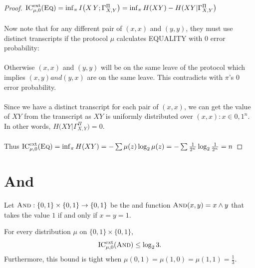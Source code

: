 \begin{proof}
	$\mathrm{IC}^{\mathrm{ext}}_{\mu,0}(\textsc{Eq}) = \inf_{\pi} I\big( X\,Y ; \Gamma_{X,Y}^\Pi \big) = \inf_{\pi} H(XY) - H(XY|\Gamma_{X,Y}^\Pi \big)$\\
	\\
	Now note that for any different pair of $(x,x)$ and $(y,y)$, they must use distinct transcripts if the protocol $\mu$ calculates EQUALITY with $0$ error probability: \\
	\\ 
	Otherwise $(x,x)$ and $(y,y)$ will be on the same leave of the protocol which implies $(x,y) and (y,x)$ are on the same leave. This contradicts with $\pi$'s $0$ error probability. \\
	\\
	Since we have a distinct transcript for each pair of $(x,x)$, we can get the value of $XY$ from the transcript as $XY$ is uniformly distributed over ${(x,x): x \in {0,1}^n}$. In other words, $H(XY|\Gamma_{X,Y}^\Pi \big) = 0$.\\
	\\
	Thus $\mathrm{IC}^{\mathrm{ext}}_{\mu,0}(\textsc{Eq}) = \inf_{\pi} H(XY) = - \sum \mu(z)\log_2\mu(z) = - \sum \frac1{2^n}\log_2\frac1{2^n} = n$
\end{proof}


\section{And}

Let $\textsc{And} : \{0,1\} \times \{0,1\} \to \{0,1\}$ be the and function $\textsc{And}(x,y) = x \wedge y$ that takes the value $1$ if and only if $x = y = 1$.

\begin{theorem}
	For every distribution $\mu$ on $\{0,1\} \times \{0,1\}$,
	\[
	\mathrm{IC}^{\mathrm{ext}}_{\mu,0}(\textsc{And}) \le \log_2 3.
	\]
	Furthermore, this bound is tight when $\mu(0,1) = \mu(1,0) = \mu(1,1) = \frac13$.
\end{theorem}

